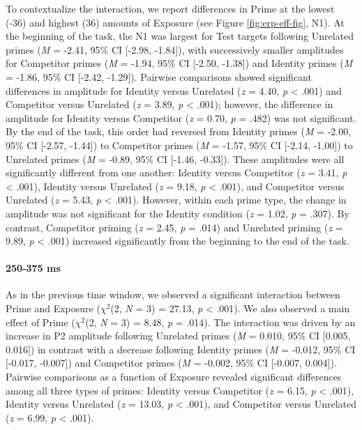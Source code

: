 \documentclass[
  12pt,
  twoside]{article}
\begin{document}
To contextualize the interaction, we report differences in Prime at the lowest (-36) and highest (36) amounts of Exposure (see Figure \ref{fig:erp-eff-fig}, N1).
At the beginning of the task, the N1 was largest for Test targets following Unrelated primes (\emph{M} = -2.41, 95\% CI {[}-2.98, -1.84{]}), with successively smaller amplitudes for Competitor primes (\emph{M} = -1.94, 95\% CI {[}-2.50, -1.38{]}) and Identity primes (\emph{M} = -1.86, 95\% CI {[}-2.42, -1.29{]}).
Pairwise comparisons showed significant differences in amplitude for Identity versus Unrelated (\emph{z} = 4.40, \emph{p} \textless{} .001) and Competitor versus Unrelated (\emph{z} = 3.89, \emph{p} \textless{} .001); however, the difference in amplitude for Identity versus Competitor (\emph{z} = 0.70, \emph{p} = .482) was not significant.
By the end of the task, this order had reversed from Identity primes (\emph{M} = -2.00, 95\% CI {[}-2.57, -1.44{]}) to Competitor primes (\emph{M} = -1.57, 95\% CI {[}-2.14, -1.00{]}) to Unrelated primes (\emph{M} = -0.89, 95\% CI {[}-1.46, -0.33{]}).
These amplitudes were all significantly different from one another: Identity versus Competitor (\emph{z} = 3.41, \emph{p} \textless{} .001), Identity versus Unrelated (\emph{z} = 9.18, \emph{p} \textless{} .001), and Competitor versus Unrelated (\emph{z} = 5.43, \emph{p} \textless{} .001).
However, within each prime type, the change in amplitude was not significant for the Identity condition (\emph{z} = 1.02, \emph{p} = .307).
By contrast, Competitor priming (\emph{z} = 2.45, \emph{p} = .014) and Unrelated priming (\emph{z} = 9.89, \emph{p} \textless{} .001) increased significantly from the beginning to the end of the task.

\hypertarget{ms-1}{%
\paragraph{250-375 ms}\label{ms-1}}

As in the previous time window, we observed a significant interaction between Prime and Exposure (\(\chi^2\)(2, \emph{N} = 3) = 27.13, \emph{p} \textless{} .001).
We also observed a main effect of Prime (\(\chi^2\)(2, \emph{N} = 3) = 8.48, \emph{p} = .014).
The interaction was driven by an increase in P2 amplitude following Unrelated primes (\emph{M} = 0.010, 95\% CI {[}0.005, 0.016{]}) in contrast with a decrease following Identity primes (\emph{M} = -0.012, 95\% CI {[}-0.017, -0.007{]}) and Competitor primes (\emph{M} = -0.002, 95\% CI {[}-0.007, 0.004{]}).
Pairwise comparisons as a function of Exposure revealed significant differences among all three types of primes: Identity versus Competitor (\emph{z} = 6.15, \emph{p} \textless{} .001), Identity versus Unrelated (\emph{z} = 13.03, \emph{p} \textless{} .001), and Competitor versus Unrelated (\emph{z} = 6.99, \emph{p} \textless{} .001).
\end{document}
